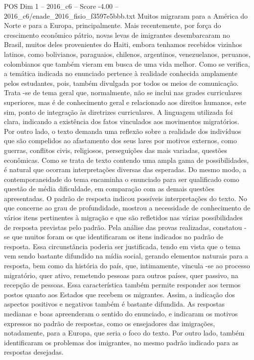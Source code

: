 \begin{textsample}{POS Dim 1 – 2016\_c6 – Score -4.00 – 2016\_c6/enade\_2016\_fisio\_f3597e5bbb.txt}
Muitos migraram para a América do Norte e para a Europa, principalmente.
Mais recentemente, por força do crescimento econômico pátrio, novas levas de imigrantes desembarcaram no Brasil, muitos deles provenientes do Haiti, embora tenhamos recebidos vizinhos latinos, como bolivianos, paraguaios, chilenos, argentinos, venezuelanos, peruanos, colombianos que também vieram em busca de uma vida melhor.
Como se verifica, a temática indicada no enunciado pertence à realidade conhecida amplamente pelos estudantes, pois, também divulgada por todos os meios de comunicação.
Trata -se de tema geral que, normalmente, não se inclui nas grades curriculares superiores, mas é de conhecimento geral e relacionado aos direitos humanos, este sim, ponto de integração às diretrizes curriculares.
A linguagem utilizada foi clara, indicando a existência dos fatos vinculados aos movimentos migratórios.
Por outro lado, o texto demanda uma reflexão sobre a realidade dos indivíduos que são compelidos ao afastamento dos seus lares por motivos externos, como guerras, conflitos civis, religiosos, perseguições das mais variadas, questões econômicas.
Como se trata de texto contendo uma ampla gama de possibilidades, é natural que ocorram interpretações diversas das esperadas.
Do mesmo modo, a contemporaneidade do tema encaminha o enunciado para ser qualificado como questão de média dificuldade, em comparação com as demais questões apresentadas.
O padrão de resposta indicou possíveis interpretações do texto.
No que concerne ao grau de profundidade, mostrou a necessidade de conhecimento de vários itens pertinentes à migração e que são refletidos nas várias possibilidades de resposta previstas pelo padrão.
Pela análise das provas realizadas, constatou -se que muitos foram os que identificaram os itens indicados no padrão de resposta.
Essa circunstância poderia ser justificada, tendo em vista que o tema vem sendo bastante difundido na mídia social, gerando elementos naturais para a resposta, bem como da história do país, que, intimamente, vincula -se ao processo migratório, quer ativo, remetendo pessoas para outros países, quer passivo, na recepção de pessoas.
Essa característica também permite responder aos termos postos quanto aos Estados que recebem os migrantes.
Assim, a indicação dos aspectos positivos e negativos também é bastante difundida.
As respostas medianas e boas apreenderam o sentido do enunciado, e indicaram os motivos expressos no padrão de respostas, como os ensejadores das imigrações, notadamente, para a Europa, que seria o foco do texto.
Por outro lado, também identificaram os problemas dos imigrantes, no mesmo padrão indicado para as respostas desejadas.

\end{textsample}

